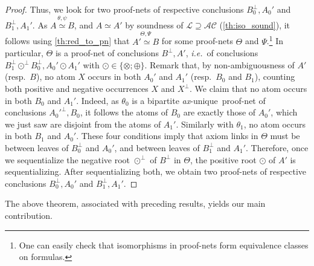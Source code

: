 \documentclass{lmcs}
\newcommand*{\orth}{^\perp} %
\newcommand*{\tens}{\otimes} %
\newcommand*{\ie}{\emph{i.e.}}
\newcommand*{\resp}{resp.}
\newcommand*{\iso}{\mathrel{\simeq}} %
\newcommand*{\Eu}{\mathcal{L}} %
\newcommand*{\AC}{\mathcal{AC}} %
\newcommand{\isoproofs}[4]{\overset{\ensuremath{#3,#4}}{#1\iso #2}}
\newcommand*{\unique}{\textit{ax}-unique}
\begin{document}
\begin{proof}
Thus, we look for two proof-nets of respective conclusions $B_0\orth,A_0'$ and $B_1\orth,A_1'$.
As $\isoproofs{A}{B}{\theta}{\psi}$, and $A\iso A'$ by soundness of $\Eu \supseteq \AC$ (\autoref{th:iso_sound}), it follows using \autoref{th:red_to_pn} that $\isoproofs{A'}{B}{\Theta}{\Psi}$ for some proof-nets $\Theta$ and $\Psi$.\footnote{One can easily check that isomorphisms in proof-nets form equivalence classes on formulas.}
In particular, $\Theta$ is a proof-net of conclusions $B\orth,A'$, \ie\ of conclusions $B_1\orth\odot\orth B_0\orth, A_0'\odot A_1'$ with $\odot\in\{\tens;\oplus\}$.
Remark that, by non-ambiguousness of $A'$ (\resp\ $B$), no atom $X$ occurs in both $A_0'$ and $A_1'$ (\resp\ $B_0$ and $B_1$), counting both positive and negative occurrences $X$ and $X\orth$.
We claim that no atom occurs in both $B_0$ and $A_1'$.
Indeed, as $\theta_0$ is a bipartite \unique\ proof-net of conclusions ${A_0'}\orth,B_0$, it follows the atoms of $B_0$ are exactly those of $A_0'$, which we just saw are disjoint from the atoms of $A_1'$.
Similarly with $\theta_1$, no atom occurs in both $B_1$ and $A_0'$.
These four conditions imply that axiom links in $\Theta$ must be between leaves of $B_0\orth$ and $A_0'$, and between leaves of $B_1\orth$ and $A_1'$.
Therefore, once we sequentialize the negative root $\odot\orth$ of $B\orth$ in $\Theta$, the positive root $\odot$ of $A'$ is sequentializing.
After sequentializing both, we obtain two proof-nets of respective conclusions $B_0\orth,A_0'$ and $B_1\orth,A_1'$.
\end{proof}

The above theorem, associated with preceding results, yields our main contribution.
\end{document}
